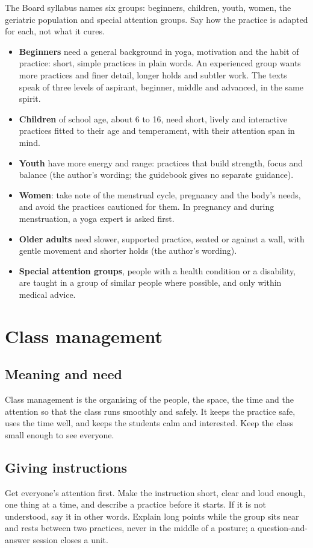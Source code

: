 The Board syllabus names six groups: beginners, children, youth, women, the geriatric population and special attention groups. Say how the practice is adapted for each, not what it cures.
\begin{itemize}
\item \textbf{Beginners} need a general background in yoga, motivation and the habit of practice: short, simple practices in plain words. An experienced group wants more practices and finer detail, longer holds and subtler work. The texts speak of three levels of aspirant, beginner, middle and advanced, in the same spirit.
\item \textbf{Children} of school age, about 6 to 16, need short, lively and interactive practices fitted to their age and temperament, with their attention span in mind.
\item \textbf{Youth} have more energy and range: practices that build strength, focus and balance (the author's wording; the guidebook gives no separate guidance).
\item \textbf{Women}: take note of the menstrual cycle, pregnancy and the body's needs, and avoid the practices cautioned for them. In pregnancy and during menstruation, a yoga expert is asked first.
\item \textbf{Older adults} need slower, supported practice, seated or against a wall, with gentle movement and shorter holds (the author's wording).
\item \textbf{Special attention groups}, people with a health condition or a disability, are taught in a group of similar people where possible, and only within medical advice.
\end{itemize}


\section{Class management}

\subsection*{Meaning and need}
Class management is the organising of the people, the space, the time and the attention so that the class runs smoothly and safely. It keeps the practice safe, uses the time well, and keeps the students calm and interested. Keep the class small enough to see everyone.

\subsection*{Giving instructions}
Get everyone's attention first. Make the instruction short, clear and loud enough, one thing at a time, and describe a practice before it starts. If it is not understood, say it in other words. Explain long points while the group sits near and rests between two practices, never in the middle of a posture; a question-and-answer session closes a unit.

